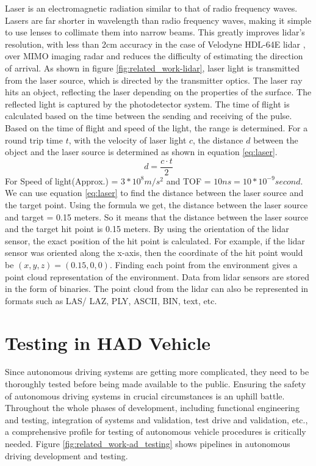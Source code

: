 Laser is an electromagnetic radiation similar to that of radio frequency waves. Lasers are far shorter in wavelength than radio frequency waves, making it simple to use lenses to collimate them into narrow beams. This greatly improves lidar's resolution, with less than 2cm accuracy in the case of Velodyne HDL-64E lidar \parencite{velodyne_64}, over MIMO imaging radar and reduces the difficulty of estimating the direction of arrival. As shown in figure \ref{fig:related_work-lidar}, laser light is transmitted from the laser source, which is directed by the transmitter optics. The laser ray hits an object, reflecting the laser depending on the properties of the surface. The reflected light is captured by the photodetector system. The time of flight is calculated based on the time between the sending and receiving of the pulse. Based on the time of flight and speed of the light, the range is determined. For a round trip time \(t\), with the velocity of laser light \(c\), the distance \(d\) between the object and the laser source is determined as shown in equation \ref{eq:laser}.
\begin{equation}\label{eq:laser}
    d = \frac{c \cdot t}{2}
\end{equation}
For Speed of light(Approx.) = \(3 * 10^8 m/s^2\) and TOF = \(10 ns = 10 * 10^{-9} second\). We can use equation \ref{eq:laser} to find the distance between the laser source and the target point. Using the formula we get, the distance between the laser source and target = 0.15 meters. So it means that the distance between the laser source and the target hit point is 0.15 meters. By using the orientation of the lidar sensor, the exact position of the hit point is calculated. For example, if the lidar sensor was oriented along the x-axis, then the coordinate of the hit point would be \((x, y, z) = (0.15, 0, 0)\). Finding each point from the environment gives a point cloud representation of the environment. Data from lidar sensors are stored in the form of binaries. The point cloud from the lidar can also be represented in formats such as LAS/ LAZ, PLY, ASCII, BIN, text, etc.

\section{Testing in HAD Vehicle}
Since autonomous driving systems are getting more complicated, they need to be thoroughly tested before being made available to the public. Ensuring the safety of autonomous driving systems in crucial circumstances is an uphill battle. Throughout the whole phases of development, including functional engineering and testing, integration of systems and validation, test drive and validation, etc., a comprehensive profile for testing of autonomous vehicle procedures is critically needed. Figure \ref{fig:related_work-ad_testing} shows pipelines in autonomous driving development and testing.

